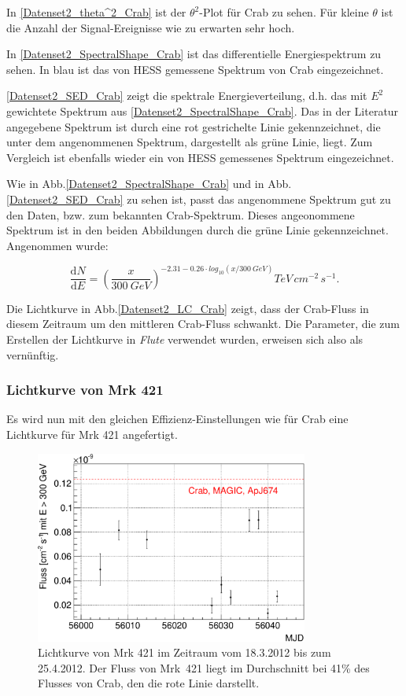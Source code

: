 In \autoref{Datenset2_theta^2_Crab} ist der $\theta^2$-Plot für Crab zu sehen. Für kleine $\theta$ ist die Anzahl der Signal-Ereignisse wie zu erwarten sehr hoch.

In \autoref{Datenset2_SpectralShape_Crab} ist das differentielle Energiespektrum zu sehen.
In blau ist das von HESS gemessene Spektrum von Crab eingezeichnet.

\autoref{Datenset2_SED_Crab} zeigt die spektrale Energieverteilung, d.h. das mit $E^2$ gewichtete Spektrum aus \autoref{Datenset2_SpectralShape_Crab}.
Das in der Literatur angegebene Spektrum ist durch eine rot gestrichelte Linie gekennzeichnet, die unter dem angenommenen Spektrum, dargestellt als grüne Linie, liegt.
Zum Vergleich ist ebenfalls wieder ein von HESS gemessenes Spektrum eingezeichnet.

Wie in Abb.\ref{Datenset2_SpectralShape_Crab} und in Abb.\ref{Datenset2_SED_Crab} zu sehen ist, passt das angenommene Spektrum gut zu den Daten, bzw. zum bekannten Crab-Spektrum.
Dieses angeonommene Spektrum ist in den beiden Abbildungen durch die grüne Linie gekennzeichnet.
Angenommen wurde:

\begin{equation}
\frac{\mathrm{d}N}{\mathrm{d}E}=\left(\frac{x}{\SI{300}{GeV}}\right)^{-2.31-0.26\cdot log_{10}(x/\SI{300}{GeV})}\si{TeV\,cm^{-2}\,s^{-1}}.
\end{equation}

Die Lichtkurve in Abb.\ref{Datenset2_LC_Crab} zeigt, dass der Crab-Fluss in diesem Zeitraum um den mittleren Crab-Fluss schwankt.
Die Parameter, die zum Erstellen der Lichtkurve in \textit{Flute} verwendet wurden, erweisen sich also als vernünftig.

\subsubsection{Lichtkurve von Mrk 421}
Es wird nun mit den gleichen Effizienz-Einstellungen wie für Crab eine Lichtkurve für Mrk 421 angefertigt.

\begin{figure}
    \centering
    \includegraphics[width=0.8\textwidth]{./Plots/04_MrkAnalyse/Datenset2/LC_Mrk421.pdf}
    \caption{Lichtkurve von Mrk 421 im Zeitraum vom 18.3.2012 bis zum 25.4.2012.
    Der Fluss von Mrk~421 liegt im Durchschnitt bei 41\% des Flusses von Crab, den die rote Linie darstellt.}
    \label{Datenset2_LC_Mrk421}
\end{figure}

